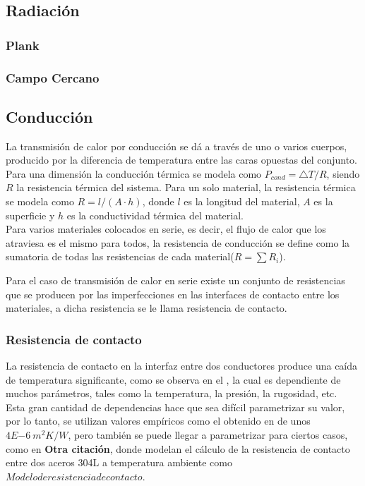 \subsection{Radiación}

\subsubsection{Plank}
\subsubsection{Campo Cercano}
\subsection{Conducción}
La transmisión de calor por conducción se dá a través de uno o varios cuerpos, producido por la diferencia de temperatura entre las caras opuestas del conjunto. Para una dimensión la conducción térmica se modela como $P_{cond}={\bigtriangleup T}/{R} $, siendo $R$ la resistencia térmica del sistema.
Para un solo material, la resistencia térmica se modela como $R = l/{\left(A\cdot h\right)}$, donde $l$ es la longitud del material, $A$ es la superficie y $h$ es la conductividad térmica del material.\\

Para varios materiales colocados en serie, es decir, el flujo de calor que los atraviesa es el mismo para todos, la resistencia de conducción se define como la sumatoria de todas las resistencias de cada material($R=\sum R_i$).

Para el caso de transmisión de calor en serie existe un conjunto de resistencias que se producen por las imperfecciones en las interfaces de contacto entre los materiales, a dicha resistencia se le llama resistencia de contacto.


\subsubsection{Resistencia de contacto}
La resistencia de contacto en la interfaz entre dos conductores produce una caída de temperatura significante, como se observa en el \cite{noauthor_parallel-plate_nodate}, la cual es dependiente de muchos parámetros, tales como la temperatura, la presión, la rugosidad, etc.\\

Esta gran cantidad de dependencias hace que sea difícil parametrizar su valor, por lo tanto, se utilizan valores empíricos como el obtenido en \cite{noauthor_parallel-plate_nodate} de unos $4E{-6} \ m^2K/W$, pero también se puede llegar a parametrizar para ciertos casos, como en \textbf{Otra citación}, donde modelan el cálculo de la resistencia de contacto entre dos aceros 304L a temperatura ambiente como $Modelo de resistencia de contacto$.